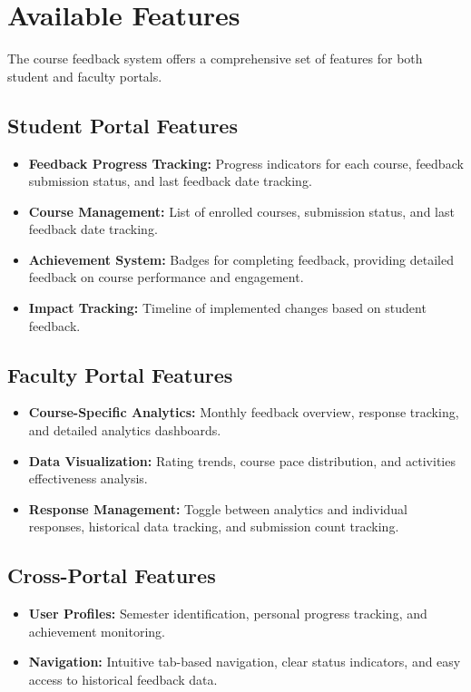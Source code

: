 \documentclass[conference]{IEEEtran}
\begin{document}
\section{Available Features}

The course feedback system offers a comprehensive set of features for both student and faculty portals.

\subsection{Student Portal Features}
\begin{itemize}
    \item \textbf{Feedback Progress Tracking: } Progress indicators for each course, feedback submission status, and last feedback date tracking.
    \item \textbf{Course Management:} List of enrolled courses, submission status, and last feedback date tracking.
    \item \textbf{Achievement System:} Badges for completing feedback, providing detailed feedback on course performance and engagement.
    \item \textbf{Impact Tracking:} Timeline of implemented changes based on student feedback.
\end{itemize}

\subsection{Faculty Portal Features}
\begin{itemize}
    \item \textbf{Course-Specific Analytics:} Monthly feedback overview, response tracking, and detailed analytics dashboards.
    \item \textbf{Data Visualization:} Rating trends, course pace distribution, and activities effectiveness analysis.
    \item \textbf{Response Management:} Toggle between analytics and individual responses, historical data tracking, and submission count tracking.
\end{itemize}

\subsection{Cross-Portal Features}
\begin{itemize}
    \item \textbf{User Profiles:} Semester identification, personal progress tracking, and achievement monitoring.
    \item \textbf{Navigation:} Intuitive tab-based navigation, clear status indicators, and easy access to historical feedback data.
\end{itemize}
\end{document}
